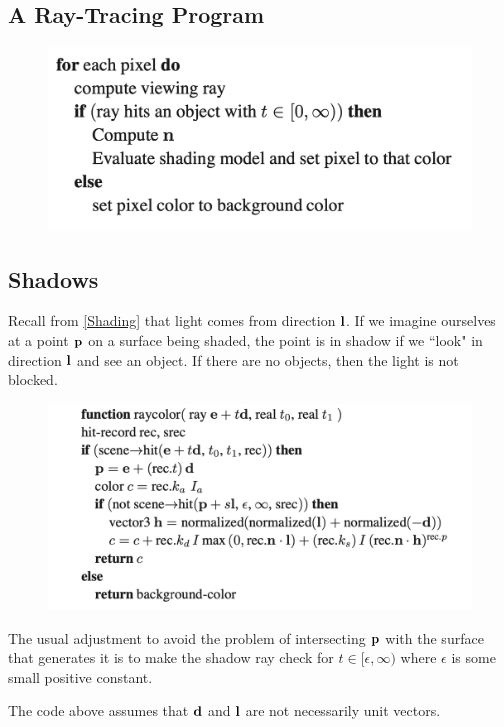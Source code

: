\documentclass[11pt]{article}
\numberwithin{equation}{section}
\begin{document}
\subsection{A Ray-Tracing Program}
\begin{figure}[H]
	\centering
	\includegraphics[scale=0.5]{p2}
\end{figure}

\subsection{Shadows}
Recall from \ref{Shading} that light comes from direction $\textbf{l}$. If we imagine ourselves at a point $\textbf{p}$ on a surface being shaded, the point is in shadow if we ``look" in direction $\textbf{l}$ and see an object. If there are no objects, then the light is not blocked.

\begin{figure}[H]
	\centering
	\includegraphics[scale=0.73]{p3}
\end{figure}

\remark
The usual adjustment to avoid the problem of intersecting $\textbf{p}$ with the surface that generates it is to make the shadow ray check for $t \in [\epsilon, \infty)$ where $\epsilon$ is some small positive constant.

\remark
The code above assumes that $\textbf{d}$ and $\textbf{l}$ are not necessarily unit vectors. 
\end{document}
